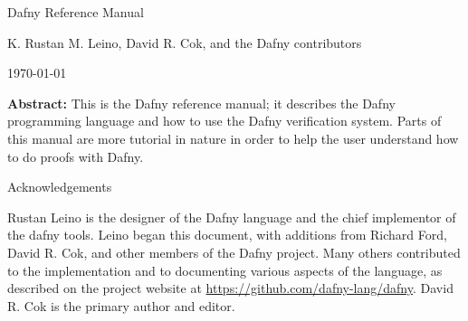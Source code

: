 \begin{center}\Huge Dafny Reference Manual\end{center}
\begin{center}K. Rustan M. Leino, David R. Cok, and the Dafny contributors\end{center}
\begin{center}\today\end{center}
\vspace{1in}
\textbf{Abstract:} This is the Dafny reference manual; it describes the Dafny programming
language and how to use the Dafny verification system.
Parts of this manual are more tutorial in nature in order to help the
user understand how to do proofs with Dafny.

\vspace{1in}
\begin{center}\Large Acknowledgements\end{center}
Rustan Leino is the designer of the Dafny language and the chief implementor of the dafny tools. 
Leino began this document, with additions from Richard Ford, David R. Cok, and other members of the Dafny project.
Many others contributed to the implementation and to documenting various aspects of the language, 
as described on the project website at \url{https://github.com/dafny-lang/dafny}.
David R. Cok is the primary author and editor.
\newpage
